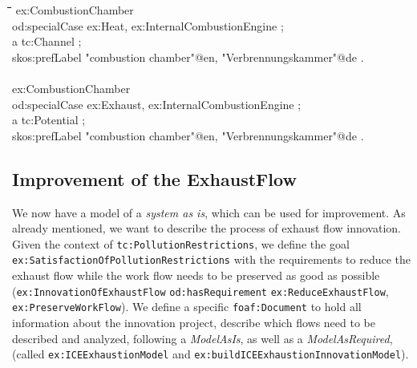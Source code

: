 \documentclass[a4paper,11pt]{article}
\newenvironment{code}{\tt \begin{tabbing}
\hskip12pt\=\hskip12pt\=\hskip12pt\=\hskip12pt\=\hskip5cm\=\hskip5cm\=\kill}
{\end{tabbing}}
\begin{document}
    \begin{code}
    ex:CombustionChamber \\
    \> od:specialCase ex:Heat, ex:InternalCombustionEngine ; \\
    \> a tc:Channel ; \\
    \> skos:prefLabel "combustion chamber"@en, "Verbrennungskammer"@de . \\
    \\
    ex:CombustionChamber \\
    \> od:specialCase ex:Exhaust, ex:InternalCombustionEngine ; \\
    \> a tc:Potential ; \\
    \> skos:prefLabel "combustion chamber"@en, "Verbrennungskammer"@de . \\
    \end{code}

    \subsection{Improvement of the ExhaustFlow}
    We now have a model of a \emph{system as is}, which can be used for
    improvement. As already mentioned, we want to describe the process 
    of exhaust flow innovation. Given the context of 
    \texttt{tc:PollutionRestrictions}, 
    we define the goal \texttt{ex:SatisfactionOfPollutionRestrictions} with the
    requirements to reduce the exhaust flow while the work flow needs to be 
    preserved as good as possible (\texttt{ex:InnovationOfExhaustFlow} 
    \texttt{od:hasRequirement} \texttt{ex:ReduceExhaustFlow}, 
    \texttt{ex:PreserveWorkFlow}). We define a specific
    \texttt{foaf:Document} to hold all information about the innovation
    project, describe which flows need to be described and analyzed,
    following a \emph{ModelAsIs}, as well as a \emph{ModelAsRequired},
    (called \texttt{ex:ICEExhaustionModel} and \newline
    \texttt{ex:buildICEExhaustionInnovationModel}).
\end{document}

